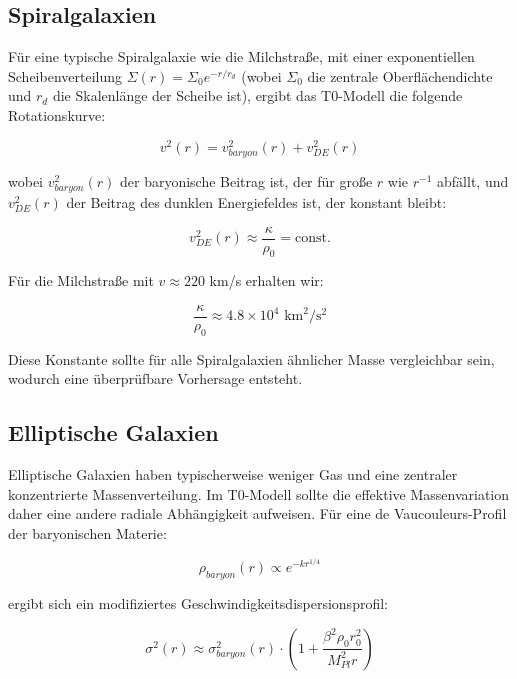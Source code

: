 \documentclass[a4paper,12pt]{article}
\begin{document}
	\subsection{Spiralgalaxien}
	
	Für eine typische Spiralgalaxie wie die Milchstraße, mit einer exponentiellen Scheibenverteilung $\Sigma(r) = \Sigma_0 e^{-r/r_d}$ (wobei $\Sigma_0$ die zentrale Oberflächendichte und $r_d$ die Skalenlänge der Scheibe ist), ergibt das T0-Modell die folgende Rotationskurve:
	
	\begin{equation}
		v^2(r) = v^2_{baryon}(r) + v^2_{DE}(r)
	\end{equation}
	
	wobei $v^2_{baryon}(r)$ der baryonische Beitrag ist, der für große $r$ wie $r^{-1}$ abfällt, und $v^2_{DE}(r)$ der Beitrag des dunklen Energiefeldes ist, der konstant bleibt:
	
	\begin{equation}
		v^2_{DE}(r) \approx \frac{\kappa}{\rho_0} = \text{const.}
	\end{equation}
	
	Für die Milchstraße mit $v \approx 220$ km/s erhalten wir:
	
	\begin{equation}
		\frac{\kappa}{\rho_0} \approx 4.8 \times 10^4 \text{ km}^2/\text{s}^2
	\end{equation}
	
	Diese Konstante sollte für alle Spiralgalaxien ähnlicher Masse vergleichbar sein, wodurch eine überprüfbare Vorhersage entsteht.
	
	\subsection{Elliptische Galaxien}
	
	Elliptische Galaxien haben typischerweise weniger Gas und eine zentraler konzentrierte Massenverteilung. Im T0-Modell sollte die effektive Massenvariation daher eine andere radiale Abhängigkeit aufweisen. Für eine de Vaucouleurs-Profil der baryonischen Materie:
	
	\begin{equation}
		\rho_{baryon}(r) \propto e^{-kr^{1/4}}
	\end{equation}
	
	ergibt sich ein modifiziertes Geschwindigkeitsdispersionsprofil:
	
	\begin{equation}
		\sigma^2(r) \approx \sigma^2_{baryon}(r) \cdot \left(1 + \frac{\beta^2\rho_0r_0^2}{M_{Pl}^2r}\right)
	\end{equation}
	
\end{document}
